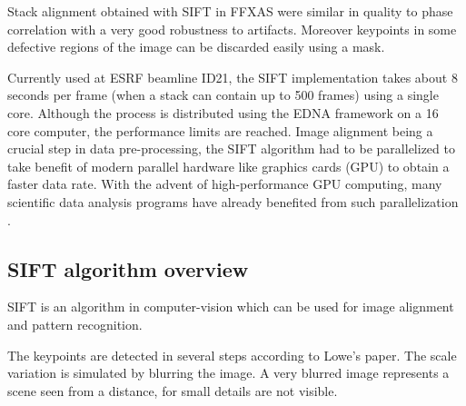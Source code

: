 \documentclass[preprint]{iucr}
\begin{document}
Stack alignment obtained with SIFT in FFXAS were similar in quality to phase
correlation with a very good robustness to artifacts.
Moreover keypoints in some defective regions of the image can be
discarded easily using a mask.

Currently used at ESRF beamline ID21, the SIFT implementation takes about 8
seconds per frame (when a stack can contain up to  500 frames) using a single
core.
Although the process is distributed using the EDNA\cite{edna} framework on a 16
core computer, the performance limits are reached.
Image alignment being a crucial step in data pre-processing, the SIFT
algorithm had to be parallelized to take benefit of modern parallel
hardware like graphics cards (GPU) to obtain a faster data rate.
With the advent of high-performance GPU computing, many scientific data analysis
programs have already benefited from such parallelization
\cite{pyhst,pyfai,Favre-Nicolin}.

\subsection{SIFT algorithm overview}
SIFT is an algorithm in computer-vision which can be used for image alignment
and pattern recognition.  

The keypoints are detected in several steps according to Lowe's paper\cite{Lowe99}.
The scale variation is simulated by blurring the image.
A very blurred image represents a scene seen from a distance, for small details are not visible.
\end{document}

